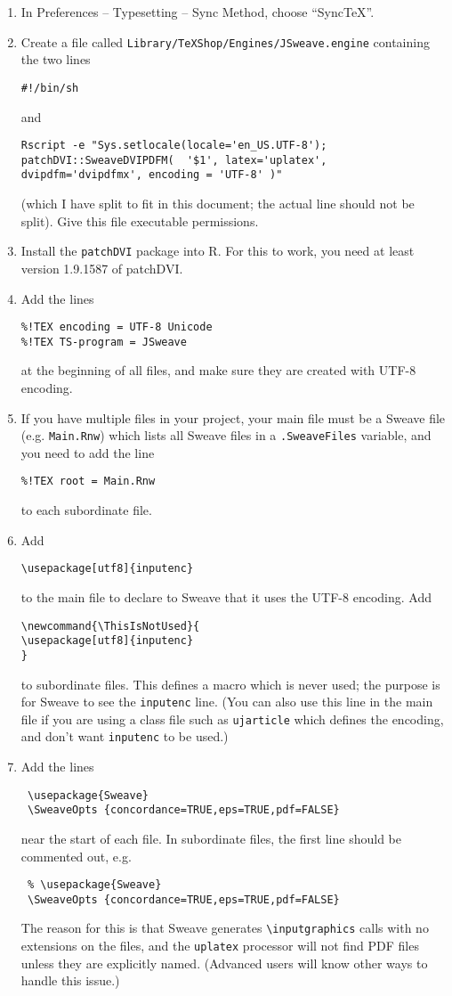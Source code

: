 \documentclass[12pt]{ujarticle}
\newcommand{\ThisIsNotUsed}{
\usepackage[utf8]{inputenc}
}
\begin{document}
\begin{enumerate}
\item In Preferences -- Typesetting -- Sync Method, choose ``SyncTeX''.
\item Create a file called \verb!Library/TeXShop/Engines/JSweave.engine! 
containing the two lines
\begin{verbatim}
#!/bin/sh
\end{verbatim}
and
\begin{verbatim}
Rscript -e "Sys.setlocale(locale='en_US.UTF-8');
patchDVI::SweaveDVIPDFM(  '$1', latex='uplatex', 
dvipdfm='dvipdfmx', encoding = 'UTF-8' )"
\end{verbatim}
(which I have split to fit in this document; the actual line should not be split).
Give this file executable permissions.  
\item Install the \texttt{patchDVI} package into R.  For this to work,  you need
at least version 1.9.1587 of patchDVI.
\item Add the lines 
\begin{verbatim}
%!TEX encoding = UTF-8 Unicode
%!TEX TS-program = JSweave
\end{verbatim}
at the beginning of all files, and make sure they are created with UTF-8 encoding.
\item If you have multiple files in your project, your main file must be a Sweave file
(e.g. \texttt{Main.Rnw}) which lists all Sweave files in a \texttt{.SweaveFiles} variable, 
and you need to add the line
\begin{verbatim}
%!TEX root = Main.Rnw
\end{verbatim}
to each subordinate file.
\item Add
\begin{verbatim}
\usepackage[utf8]{inputenc}
\end{verbatim}
to the main file to declare to Sweave that it uses the UTF-8 encoding.  Add
\begin{verbatim}
\newcommand{\ThisIsNotUsed}{
\usepackage[utf8]{inputenc}
}
\end{verbatim}
to subordinate files.  This defines a macro which is never used; the purpose is
for Sweave to see the \texttt{inputenc} line.  (You can also use this line in the main file
if you are using a class file such as \texttt{ujarticle} which defines the encoding, 
and don't want \texttt{inputenc} to be used.)
\item \label{point:eps} Add the lines
\begin{verbatim}
 \usepackage{Sweave}
 \SweaveOpts {concordance=TRUE,eps=TRUE,pdf=FALSE}
\end{verbatim}
near the start of each file.  In subordinate files, the first line should be commented out, e.g.
\begin{verbatim}
 % \usepackage{Sweave}
 \SweaveOpts {concordance=TRUE,eps=TRUE,pdf=FALSE}
\end{verbatim}
The reason for this is that Sweave generates \verb!\inputgraphics! calls with no extensions on the files,
and the \texttt{uplatex} processor will not find PDF files unless they are explicitly 
named.  (Advanced users will know other ways to handle this issue.)

\end{enumerate}
\end{document}
